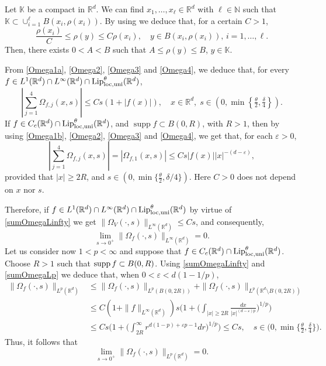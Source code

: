 \documentclass[10pt, a4paper, reqno]{amsart}
\theoremstyle{definition}
\theoremstyle{remark}
\DeclareMathOperator{\supp}{supp}
\numberwithin{equation}{section}
\begin{document}
Let $\mathbb K$ be a compact in $\mathbb R^d$. We can find $x_1,\ldots,x_\ell \in \mathbb R^d$ with $\ell \in \mathbb N$ such that
$\mathbb K\subset \cup_{i=1}^\ell B(x_i,\rho (x_i))$. By using \cite[Proposition 1]{DGMTZ} we deduce that, for a certain $C>1$,
\[
\frac{\rho (x_i)}{C}\leq \rho (y)\leq C\rho (x_i),\quad y\in B(x_i,\rho (x_i)),\,i=1,\ldots, \ell.
\]
Then, there exists $0<A<B$ such that $A\leq \rho (y)\leq B$, $y\in \mathbb K$. 

From \eqref{Omega1a}, \eqref{Omega2}, \eqref{Omega3} and \eqref{Omega4}, we deduce that, for every $f\in L^1(\mathbb R^d)\cap L^\infty(\mathbb R^d)\cap {\textup{Lip}}^\theta _{{\rm loc, uni}}(\mathbb R^d)$,
\begin{equation}\label{sumOmegaLinfty}
\left|\sum_{j=1}^4\Omega_{f,j}(x,s)\right|\leq Cs(1+|f(x)|),\quad x\in \mathbb R^d,\;s\in 
\left(0,\min\left\{\tfrac{\theta }{2},\tfrac{\delta}{4}\right\}\right).
\end{equation}
If $f\in C_c(\mathbb R^d)\cap {\textup{Lip}}^\theta _{{\rm loc, uni}}(\mathbb R^d)$, and $\supp f\subset B(0,R)$, with $R>1$, then by using \eqref{Omega1b}, \eqref{Omega2}, \eqref{Omega3} and \eqref{Omega4}, we get that, for each $\varepsilon >0$, 
\begin{equation}\label{sumOmegaLp}
\left|\sum_{j=1}^4\Omega_{f,j}(x,s)\right|=|\Omega_{f,1}(x,s)|\leq Cs|f(x)||x|^{-(d-\varepsilon)},
\end{equation}
provided that $|x|\geq 2R$, and $s\in (0,\min\{\tfrac{\theta}{2},\delta/4\})$. Here  $C>0$ does not depend on $x$ nor $s$.

Therefore, if $f\in L^1(\mathbb R^d)\cap L^\infty (\mathbb R^d)\cap {\textup{Lip}}^\theta _{{\rm loc, uni}}(\mathbb R^d)$ by virtue of \eqref{sumOmegaLinfty} we get $\|\Omega _V(\cdot ,s)\|_{L^\infty (\mathbb R^d)}\leq Cs$, and consequently,
\[
\lim_{s\rightarrow 0^+}\|\Omega _f(\cdot ,s)\|_{L^\infty (\mathbb R^d)}=0.
\]
Let us consider now $1<p<\infty$ and suppose that $f\in  C_c(\mathbb R^d)\cap {\textup{Lip}}^\theta _{{\rm loc, uni}}(\mathbb R^d)$. Choose $R>1$ such that ${\rm supp }\,f\subset B(0,R)$. Using \eqref{sumOmegaLinfty} and \eqref{sumOmegaLp} we deduce that, when $0<\varepsilon<d(1-1/p)$, 
\begin{align*}
\|\Omega_f(\cdot,s)\|_{L^p(\mathbb R^d)}&\leq \|\Omega_f(\cdot,s)\|_{L^p(B(0,2R))}+\|\Omega_f(\cdot,s)\|_{L^p(\mathbb R^d\setminus B(0,2R))}\\
&\leq C(1+\|f\|_{L^\infty (\mathbb R^d)})s\Big(1+\Big(\int_{|x|\geq 2R}\frac{dx}{|x|^{(d-\varepsilon)p}}\Big)^{1/p}\Big)\\
&\leq Cs\Big(1+\Big(\int_{2R}^\infty r^{d(1-p)+\varepsilon p-1}dr\Big)^{1/p}\Big)\leq Cs,\quad s\in \big(0,\min\{\tfrac{\theta}{2},\tfrac{\delta}{4}\}\big).
\end{align*}
Thus, it follows that
\[
\lim_{s\rightarrow 0^+}\|\Omega_f(\cdot ,s)\|_{L^p(\mathbb R^d)}=0.
\]
\end{document}
